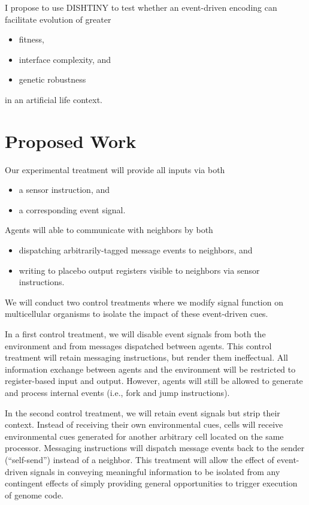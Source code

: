 I propose to use DISHTINY to test whether an event-driven encoding can facilitate evolution of greater
\begin{itemize}
  \item fitness,
  \item interface complexity, and
  \item genetic robustness
\end{itemize}
in an artificial life context.

\section{Proposed Work}

Our experimental treatment will provide all inputs via both
\begin{itemize}
  \item a sensor instruction, and
  \item a corresponding event signal.
\end{itemize}
Agents will able to communicate with neighbors by both
\begin{itemize}
  \item dispatching arbitrarily-tagged message events to neighbors, and
  \item writing to placebo output registers visible to neighbors via sensor instructions.
\end{itemize}

We will conduct two control treatments where we modify signal function on multicellular organisms to isolate the impact of these event-driven cues.

In a first control treatment, we will disable event signals from both the environment and from messages dispatched between agents.
This control treatment will retain messaging instructions, but render them ineffectual.
All information exchange between agents and the environment will be restricted to register-based input and output.
However, agents will still be allowed to generate and process internal events (i.e., fork and jump instructions).

In the second control treatment, we will retain event signals but strip their context.
Instead of receiving their own environmental cues, cells will receive environmental cues generated for another arbitrary cell located on the same processor.
Messaging instructions will dispatch message events back to the sender (``self-send'') instead of a neighbor.
This treatment will allow the effect of event-driven signals in conveying meaningful information to be isolated from any contingent effects of simply providing general opportunities to trigger execution of genome code.


